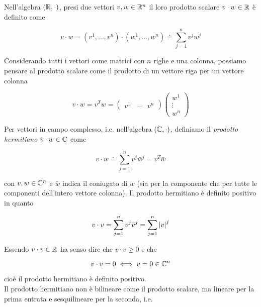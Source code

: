 Nell'algebra $ (\mathbb{R},\cdot) $, presi due vettori $ v,w \in \mathbb{R}^{n} $ il loro prodotto scalare $ v \cdot w \in \mathbb{R} $ è definito come

\begin{equation}
	v \cdot w = (v^{1},\dots,v^{n}) \cdot (w^{1},\dots,w^{n}) \doteq \sum_{j=1}^{n} v^{j} w^{j}
\end{equation}

Considerando tutti i vettori come matrici con $ n $ righe e una colonna, possiamo pensare al prodotto scalare come il prodotto di un vettore riga per un vettore colonna

\begin{equation}
	v \cdot w = v^{T} w = %
	\begin{pmatrix}
		v^{1} & \cdots & v^{n}
	\end{pmatrix}%
	\begin{pmatrix}
		w^{1} \\ \vdots \\ w^{n}
	\end{pmatrix}
\end{equation}

Per vettori in campo complesso, i.e. nell'algebra $ (\mathbb{C},\cdot) $, definiamo il \textit{prodotto hermitiano} $ v \cdot w \in \mathbb{C} $ come

\begin{equation}
	v \cdot w \doteq \sum_{j=1}^{n} v^{j} \bar{w}^{j} = v^{T} \bar{w}
\end{equation}

con $ v,w \in \mathbb{C}^{n} $ e $ \bar{w} $ indica il coniugato di $ w $ (sia per la componente che per tutte le componenti dell'intero vettore colonna). Il prodotto hermitiano è definito positivo in quanto

\begin{equation}
	v \cdot v = \sum_{j=1}^{n} v^{j} \bar{v}^{j} = \sum_{j=1}^{n} \abs{v}^{j}
\end{equation}

Essendo $ v \cdot v \in \mathbb{R} $ ha senso dire che $ v \cdot v \geqslant 0 $ e che

\begin{equation}
	v \cdot v = 0 \iff v = 0 \in \mathbb{C}^{n}
\end{equation}

cioè il prodotto hermitiano è definito positivo.\\
Il prodotto hermitiano non è bilineare come il prodotto scalare, ma lineare per la prima entrata e sesquilineare per la seconda, i.e.

